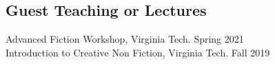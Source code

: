 \subsection{Guest Teaching or Lectures}

Advanced Fiction Workshop, Virginia Tech. \hfill Spring 2021 \\
Introduction to Creative Non Fiction, Virginia Tech. \hfill Fall 2019 \\